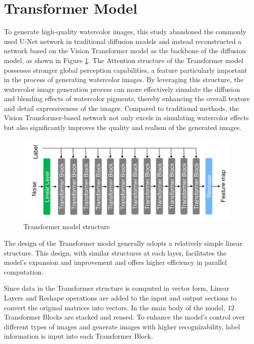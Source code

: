 \documentclass[12pt]{report}
\begin{document}
\section{Transformer Model}
To generate high-quality watercolor images, this study abandoned the commonly used U-Net network in traditional diffusion models and instead reconstructed a network based on the Vision Transformer model as the backbone of the diffusion model, as shown in Figure \ref{fig:traM}. The Attention structure of the Transformer model possesses stronger global perception capabilities, a feature particularly important in the process of generating watercolor images. By leveraging this structure, the watercolor image generation process can more effectively simulate the diffusion and blending effects of watercolor pigments, thereby enhancing the overall texture and detail expressiveness of the images. Compared to traditional methods, the Vision Transformer-based network not only excels in simulating watercolor effects but also significantly improves the quality and realism of the generated images.

\begin{figure}[htbp]
    \centering
    \includegraphics[width=16cm]{image/traM.pdf}
    \caption{Transformer model structure}
    \label{fig:traM}
\end{figure}

The design of the Transformer model generally adopts a relatively simple linear structure. This design, with similar structures at each layer, facilitates the model's expansion and improvement and offers higher efficiency in parallel computation.

Since data in the Transformer structure is computed in vector form, Linear Layers and Reshape operations are added to the input and output sections to convert the original matrices into vectors. In the main body of the model, 12 Transformer Blocks are stacked and reused. To enhance the model's control over different types of images and generate images with higher recognizability, label information is input into each Transformer Block.
\end{document}
